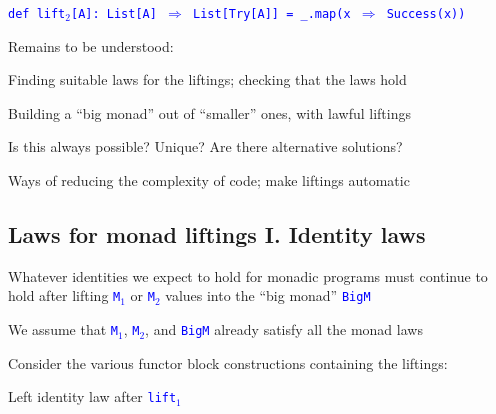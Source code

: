 \texttt{\textcolor{blue}{\footnotesize{}def lift$_{2}${[}A{]}: List{[}A{]}
$\Rightarrow$ List{[}Try{[}A{]}{]} = \_.map(x $\Rightarrow$ Success(x))}}{\footnotesize\par}

{\footnotesize{}\vspace{-0.1cm}}Remains to be understood:

Finding suitable laws for the liftings; checking that the laws hold

Building a ``big monad'' out of ``smaller'' ones, with lawful
liftings

Is this always possible? Unique? Are there alternative solutions?

Ways of reducing the complexity of code; make liftings automatic


\subsection{Laws for monad liftings I. Identity laws}

Whatever identities we expect to hold for monadic programs must continue
to hold after lifting \texttt{\textcolor{blue}{\footnotesize{}M$_{1}$}}
or \texttt{\textcolor{blue}{\footnotesize{}M$_{2}$}} values into
the ``big monad'' \texttt{\textcolor{blue}{\footnotesize{}BigM}} 

We assume that \texttt{\textcolor{blue}{\footnotesize{}M$_{1}$}},
\texttt{\textcolor{blue}{\footnotesize{}M$_{2}$}}, and \texttt{\textcolor{blue}{\footnotesize{}BigM}}
already satisfy all the monad laws

Consider the various functor block constructions containing the liftings:

Left identity law after \texttt{\textcolor{blue}{\footnotesize{}lift$_{1}$}} 

